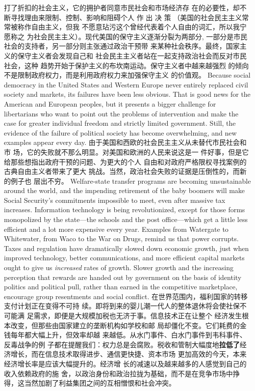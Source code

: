 \begin{paracol}{2}
打了折扣的社会主义，它的拥护者同意市民社会和市场经济存
在的必要性，却不断寻找理由来限制、控制、影响和阻碍个人
作 出 决 策 （美国的社会民主主义常常被称作自由主义，但我
不愿意玷污这个曾经代表着个人自由的词汇，所以我宁愿称之
为社会民主主义）。现代美国的保守主义逐渐分裂为两部分,
一部分是市民社会的支持者，另一部分则主张通过政治干预带
来某种社会秩序。最终，国家主义的保守主义者会发现自己和
社会民主主义者站在一起支持政治社会而反对市民社会，这种
趋势开始于保护主义的布坎南运动。保守主义者中越来越强烈
的倾向不是限制政府权力，而是利用政府权力来加强保守主义
的价值观。
\switchcolumn*
Because social democracy in the United States and Western
Europe never entirely replaced civil society and markets, its failures have been less obvious. That is good news for the American
and European peoples, but it presents a bigger challenge for libertarians who want to point out the problems of intervention
and make the case for greater individual freedom and strictly
limited government. Still, the evidence of the failure of political
society has become overwhelming, and new examples appear
every day.
\switchcolumn
由于美国和西欧的社会民主主义从未替代市民社会和市
场，它的失败就不那么明显。对美国和欧洲的人民来说这是一
件好事，但是它给那些想指出政府干预的问题、为更大的个人
自由和对政府严格限权寻找案例的古典自由主义者带来了更大
挑战。当然，政治社会失败的证据是压倒性的，而新的例子也
层出不穷。
\switchcolumn*
Welfare-state transfer programs are becoming unsustainable
around the world, and the impending retirement of the baby
boomers will make Social Security's commitments impossible
to meet, even after massive tax increases. Information technology is being revolutionized, except for those forms monopolized
by the state---the schools and the post office---which get a little
less efficient and a lot more expensive every year. Examples
from Watergate to Whitewater, from Waco to the War on
Drugs, remind us that power corrupts. Taxes and regulation
have dramatically slowed down economic growth, just when
improved technology, better communications, and more efficient capital markets ought to give us \textit{increased} rates of growth.
Slower growth and the increasing perception that rewards are
handed out by government on the basis of identity politics and
political pull, rather than earned in the competitive marketplace, encourage group resentments and social conflict.
\switchcolumn
在世界范围内，福利国家的转移支付计划正在变得不可持
续。即将到来的婴儿潮一代人的整体退休将会使社保不可能满
足需求，即便是大规模加税也无济于事。信息技术正在让整个
经济发生根本改变，但那些由国家建立的垄断机构如学校和邮
局却僵化不变。它们耗费的金钱每年都大幅上升，但效率却越
来越低。从水门事件、白水门事件到韦科事件、反毒战争的例
子都在提醒我们：权力总是会腐败。税收和管制大幅度地\textbf{拉低了}经济增长，而在信息技术取得进步、通信更快捷、资本市场
更加高效的今天，本来经济增长率是应该大幅提升的。经济增
长的减速以及越来越多的人感觉到自己的收入依赖政府的施
舍，以政治身份和政治拉拢为基础，而不是在竞争市场中挣
得，这当然加剧了利益集团之间的互相憎恨和社会冲突。


\end{paracol}
